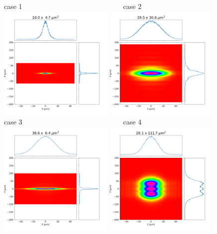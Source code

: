 \documentclass[]{article}
\begin{document}
  

\thispagestyle{empty}


\begin{figure}
    \centering
    case 1~~~~~~~~~~~~~~~~~~~~~~~~~~~~~case 2\\
    \includegraphics[width=0.49\textwidth]{figures/case1_comsyl.png}
    \includegraphics[width=0.49\textwidth]{figures/case2_comsyl.png}\\
    case 3~~~~~~~~~~~~~~~~~~~~~~~~~~~~~case 4\\
    \includegraphics[width=0.49\textwidth]{figures/case3_comsyl.png}
    \includegraphics[width=0.49\textwidth]{figures/case4_comsyl.png}
\end{figure}

\end{document}
